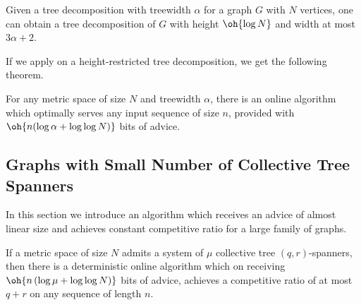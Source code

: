 \begin{lemma} \cite{Bodlaender93atourist,ICALP11} \label{lem:depthtc}
Given a tree decomposition with treewidth $\alpha$ for a graph $G$ with $N$ vertices, one can obtain a tree decomposition of $G$ with height $\oh {\log N}$ and width at most $3\alpha+2$.
\end{lemma}

If we apply \npc on a height-restricted tree decomposition, we get the following theorem.

\begin{theorem}\label{UpperBoundTreeWidth}
 For any metric space of size $N$ and treewidth $\alpha$, there is an online algorithm which optimally serves any input sequence of size $n$, provided with $\oh{n (\log \alpha + \log \log N)}$ bits of advice.
\end{theorem}


\subsection{Graphs with Small Number of Collective Tree Spanners}

In this section we introduce an algorithm which receives an advice of almost linear size and achieves constant competitive ratio for a large family of graphs. 



\begin{theorem}\label{thspan}
If a metric space of size $N$ admits a system of $\mu$ collective tree $(q,r)$-spanners, then there is a deterministic online algorithm which on receiving 
$ \oh{n \left(\log \mu + \log\log N\right)}$ bits of advice, achieves a competitive ratio of at most $q+r$ on any sequence of length $n$.
\end{theorem}

